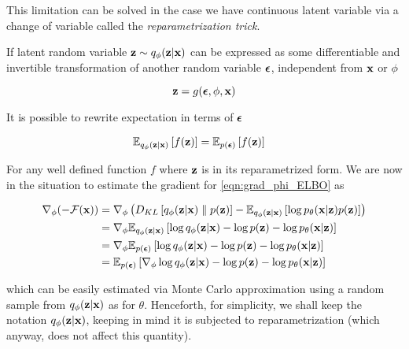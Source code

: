 \documentclass[12pt]{article}
\begin{document}
This limitation can be solved in the case we have continuous latent variable via a change of variable called the \textit{reparametrization trick}.


If latent random variable \(\textbf{z} \sim q_\phi (\textbf{z}|\textbf{x})\) can be expressed as some differentiable and invertible transformation of another random variable \(\bm{\epsilon}\), independent from \(\textbf{x}\) or \(\phi\)

\begin{equation}
    \textbf{z} = g(\bm{\epsilon}, \phi, \textbf{x})
\end{equation}

It is possible to rewrite expectation in terms of \(\bm{\epsilon}\) \cite{kingma2022autoencoding}\cite{VAEIntro}

\begin{align}
    \label{eqn:reparametrization}
    \mathbb{E}_{q_{\phi}(\textbf{z}|\textbf{x})} \left[f(\textbf{z}) \right] 
    &= \mathbb{E}_{p(\bm{\epsilon})} \left[f(\textbf{z}) \right]
\end{align}

For any well defined function \(f\) where \(\textbf{z}\) is in its reparametrized form. We are now in the situation to estimate the gradient for \eqref{eqn:grad_phi_ELBO} as

\begin{align}
    \nabla_{\phi}(-\mathcal{F}(\textbf{x})) &= \nabla_{\phi} \left( D_{KL}\left[ q_{\phi}(\textbf{z}|\textbf{x}) \parallel p(\textbf{z}) \right] - \mathbb{E}_{q_{\phi}(\textbf{z}|\textbf{x})} \left[ \log p_{\theta}(\textbf{x}|\textbf{z})p(\textbf{z}) \right] \right) \nonumber \\
    &= \nabla_{\phi} \mathbb{E}_{q_{\phi}(\textbf{z}|\textbf{x})} \left[\log q_\phi (\textbf{z}|\textbf{x}) -\log p(\textbf{z}) - \log p_\theta (\textbf{x} | \textbf{z})\right] \nonumber \\
    &= \nabla_{\phi} \mathbb{E}_{p(\bm{\epsilon})} \left[\log q_\phi (\textbf{z}|\textbf{x}) -\log p(\textbf{z}) - \log p_\theta (\textbf{x} | \textbf{z})\right] \nonumber \\
    &= \mathbb{E}_{p(\bm{\epsilon})} \left[\nabla_{\phi} \log q_\phi (\textbf{z}|\textbf{x}) -\log p(\textbf{z}) - \log p_\theta (\textbf{x} | \textbf{z}) \right] 
\end{align}


which can be easily estimated via Monte Carlo approximation using a random sample from \(q_\phi (\textbf{z}|\textbf{x})\) as for \(\theta\). Henceforth, for simplicity, we shall keep the notation \(q_{\phi}(\textbf{z}|\textbf{x})\), keeping in mind it is subjected to reparametrization (which anyway, does not affect this quantity).
\end{document}
